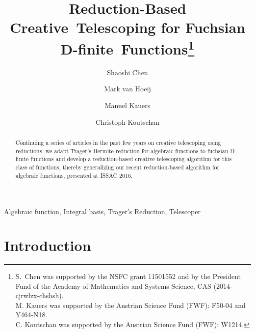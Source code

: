 \documentclass[final,1p,times,authoryear]{elsarticle}
\begin{document}
\begin{frontmatter}

  \title{Reduction-Based Creative~Telescoping for Fuchsian D-finite~Functions\footnote{S.\ Chen was supported by the NSFC grant
11501552 and by the President Fund of the Academy of
Mathematics and Systems Science, CAS (2014-cjrwlzx-chshsh).\\
M. Kauers was supported by the Austrian Science Fund (FWF): F50-04 and Y464-N18.\\
C. Koutschan was supported by the Austrian Science Fund (FWF): W1214.
}}

  \author{Shaoshi Chen}
  \address{KLMM,\, AMSS, \,Chinese Academy of Sciences, Beijing, 100190, (China)}

  \author{Mark van Hoeij}
  \address{Department of Mathematics,  Florida State University, FL 32306-4510, (USA)}

  \author{Manuel Kauers}
  \address{Institute for Algebra, Johannes Kepler University, Altenberger Stra\ss e 69, A-4040 Linz, (Austria)}

  \author{Christoph Koutschan}
  \address{RICAM, Austrian Academy of Sciences, Altenberger Stra\ss e 69, A-4040 Linz, (Austria)}
  
\begin{abstract}
  Continuing a series of articles in the past few years on creative telescoping using reductions,
  we adapt Trager's Hermite reduction for algebraic functions to fuchsian D-finite functions and
  develop a reduction-based creative telescoping algorithm for this class of functions, thereby
  generalizing our recent reduction-based algorithm for algebraic functions, presented at ISSAC 2016.
\end{abstract}

\begin{keyword}
  Algebraic function,
  Integral basis,
  Trager's Reduction,
  Telescoper
\end{keyword}
\end{frontmatter}

\section{Introduction}\label{SECT:intro}
\end{document}
